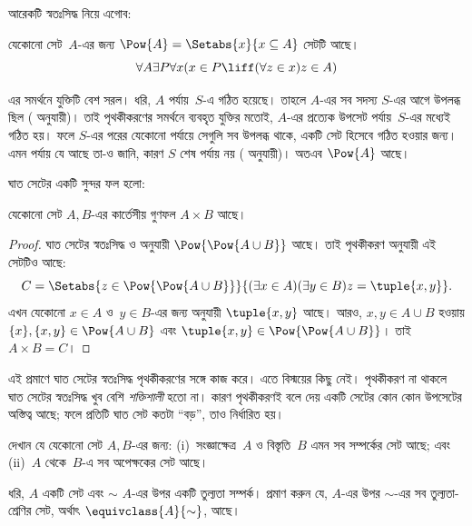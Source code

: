 \documentclass[../../../include/open-logic-section]{subfiles}
\begin{document}

আরেকটি স্বতঃসিদ্ধ নিয়ে এগোব:

\begin{axiom}[ঘাত সেট]
যেকোনো সেট~$A$-এর জন্য
$\Pow{A} = \Setabs{x}{x \subseteq A}$ সেটটি আছে।
\[
  \forall A \exists P \forall x(x \in P \liff (\forall z \in x)z \in A)
\]
\end{axiom}

এর সমর্থনে যুক্তিটি বেশ সরল। ধরি, $A$ পর্যায়~$S$-এ
গঠিত হয়েছে। তাহলে $A$-এর সব সদস্য $S$-এর আগে
উপলব্ধ ছিল (\stagesacc{} অনুযায়ী)। তাই পৃথকীকরণের
সমর্থনে ব্যবহৃত যুক্তির মতোই, $A$-এর প্রত্যেক উপসেট
পর্যায়~$S$-এর মধ্যেই গঠিত হয়। ফলে $S$-এর পরের
যেকোনো পর্যায়ে সেগুলি সব উপলব্ধ থাকে, একটি
সেট হিসেবে গঠিত হওয়ার জন্য। এমন পর্যায় যে আছে
তা-ও জানি, কারণ $S$ শেষ পর্যায় নয়
(\stagessucc{} অনুযায়ী)। অতএব $\Pow{A}$ আছে।

ঘাত সেটের একটি সুন্দর ফল হলো:

\begin{prop}\label{thm:Products}
যেকোনো সেট $A, B$-এর কার্তেসীয় গুণফল
$A \times B$ আছে।
\end{prop}

\begin{proof}
ঘাত সেটের স্বতঃসিদ্ধ ও
 অনুযায়ী
$\Pow{\Pow{A \cup B}}$ আছে। তাই পৃথকীকরণ
অনুযায়ী এই সেটটিও আছে:
\[
  C = \Setabs{z \in \Pow{\Pow{A \cup B}}}{(\exists x \in A)(\exists y \in B) z = \tuple{x, y}}.
\]
এখন যেকোনো $x \in A$ ও~$y \in B$-এর জন্য
 অনুযায়ী
$\tuple{x, y}$ আছে। আরও, $x, y \in A \cup B$
হওয়ায় $\{x\}, \{x, y\} \in \Pow{A \cup B}$ এবং
$\tuple{x,y} \in \Pow{\Pow{A \cup B}}$।
তাই $A \times B = C$।
\end{proof}

এই প্রমাণে ঘাত সেটের স্বতঃসিদ্ধ পৃথকীকরণের সঙ্গে
কাজ করে। এতে বিস্ময়ের কিছু নেই। পৃথকীকরণ না
থাকলে ঘাত সেটের স্বতঃসিদ্ধ খুব বেশি \emph{শক্তিশালী}
হতো না। কারণ পৃথকীকরণই বলে দেয় একটি সেটের
কোন কোন উপসেটের অস্তিত্ব আছে; ফলে প্রতিটি ঘাত
সেট কতটা ``বড়'', তাও নির্ধারিত হয়।

\begin{prob}
দেখান যে যেকোনো সেট $A, B$-এর জন্য:
(i)~সংজ্ঞাক্ষেত্র~$A$ ও বিস্তৃতি~$B$ এমন সব সম্পর্কের
সেট আছে; এবং (ii)~$A$ থেকে~$B$-এ সব অপেক্ষকের
সেট আছে।
\end{prob}

\begin{prob}
ধরি, $A$ একটি সেট এবং $\sim$ $A$-এর উপর একটি
তুল্যতা সম্পর্ক। প্রমাণ করুন যে, $A$-এর উপর
$\sim$-এর সব তুল্যতা-শ্রেণির সেট, অর্থাৎ
$\equivclass{A}{\sim}$, আছে।
\end{prob}
\end{document}

